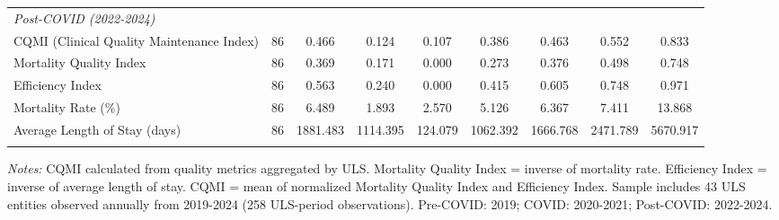 \begin{table}[htbp]
\begin{tabular}{lcccccccc}
\\
\multicolumn{9}{l}{\textit{Post-COVID (2022-2024)}} \\
CQMI (Clinical Quality Maintenance Index) & 86 & 0.466 & 0.124 & 0.107 & 0.386 & 0.463 & 0.552 & 0.833 \\
Mortality Quality Index & 86 & 0.369 & 0.171 & 0.000 & 0.273 & 0.376 & 0.498 & 0.748 \\
Efficiency Index & 86 & 0.563 & 0.240 & 0.000 & 0.415 & 0.605 & 0.748 & 0.971 \\
Mortality Rate (\%) & 86 & 6.489 & 1.893 & 2.570 & 5.126 & 6.367 & 7.411 & 13.868 \\
Average Length of Stay (days) & 86 & 1881.483 & 1114.395 & 124.079 & 1062.392 & 1666.768 & 2471.789 & 5670.917 \\
\\
\hline\hline
\end{tabular}
\begin{tablenotes}
\small
\item \textit{Notes:} CQMI calculated from quality metrics aggregated by ULS. Mortality Quality Index = inverse of mortality rate. Efficiency Index = inverse of average length of stay. CQMI = mean of normalized Mortality Quality Index and Efficiency Index. Sample includes 43 ULS entities observed annually from 2019-2024 (258 ULS-period observations). Pre-COVID: 2019; COVID: 2020-2021; Post-COVID: 2022-2024.
\end{tablenotes}
\end{table}